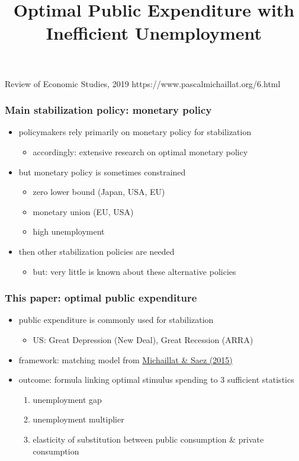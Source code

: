 \documentclass[12pt,xcolor={dvipsnames},hyperref={pdftex,pdfpagemode=UseNone,hidelinks,pdfdisplaydoctitle=true},usepdftitle=false]{beamer}
\begin{document}
\title{Optimal Public Expenditure with Inefficient Unemployment}
%
{Review of Economic Studies, 2019}%
{https://www.pascalmichaillat.org/6.html}
\frame[plain]{\titlepage}

\begin{frame}
\frametitle{Main stabilization policy: monetary policy}
\begin{itemize}
\item policymakers rely primarily on monetary policy for stabilization
\begin{itemize}
\item accordingly: extensive research on optimal monetary policy
\end{itemize}
\item but monetary policy is sometimes constrained
\begin{itemize}
\item zero lower bound (Japan, USA, EU)
\item monetary union (EU, USA)
\item[\then] high unemployment
\end{itemize}
\item then other stabilization policies are needed
\begin{itemize}
\item but: very little is known about these alternative policies 
\end{itemize}
\end{itemize}
\end{frame}

\begin{frame}
\frametitle{This paper: optimal public expenditure} 
\begin{itemize}
\item public expenditure is commonly used for stabilization
\begin{itemize}
\item US: Great Depression (New Deal), Great Recession (ARRA)
\end{itemize}
\item framework: matching model from \href{https://www.pascalmichaillat.org/3.html}{Michaillat \& Saez (2015)}
\item outcome: formula linking optimal stimulus spending to 3 sufficient statistics
\begin{enumerate}
\item unemployment gap
\item unemployment multiplier
\item elasticity of substitution between public consumption \& private consumption
\end{enumerate}
\end{itemize}
\end{frame}
\end{document}

